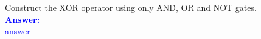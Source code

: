 \item{}
Construct the XOR operator using only AND, OR and NOT gates.\\[12pt]
\ifanswers
\textcolor{blue}{
\textbf{Answer:}\\
answer
}
\newpage
\fi

